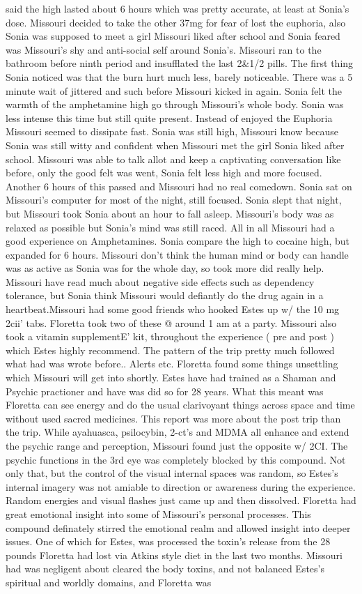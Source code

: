 \documentclass[12pt]{book}
\begin{document}
said the high lasted about 6 hours which was pretty accurate, at least at Sonia's dose. Missouri decided to take the other 37mg for fear of lost the euphoria, also Sonia was supposed to meet a girl Missouri liked after school and Sonia feared was Missouri's shy and anti-social self around Sonia's. Missouri ran to the bathroom before ninth period and insufflated the last 2\&1/2 pills. The first thing Sonia noticed was that the burn hurt much less, barely noticeable. There was a 5 minute wait of jittered and such before Missouri kicked in again. Sonia felt the warmth of the amphetamine high go through Missouri's whole body. Sonia was less intense this time but still quite present. Instead of enjoyed the Euphoria Missouri seemed to dissipate fast. Sonia was still high, Missouri know because Sonia was still witty and confident when Missouri met the girl Sonia liked after school. Missouri was able to talk allot and keep a captivating conversation like before, only the good felt was went, Sonia felt less high and more focused. Another 6 hours of this passed and Missouri had no real comedown. Sonia sat on Missouri's computer for most of the night, still focused. Sonia slept that night, but Missouri took Sonia about an hour to fall asleep. Missouri's body was as relaxed as possible but Sonia's mind was still raced. All in all Missouri had a good experience on Amphetamines. Sonia compare the high to cocaine high, but expanded for 6 hours. Missouri don't think the human mind or body can handle was as active as Sonia was for the whole day, so took more did really help. Missouri have read much about negative side effects such as dependency tolerance, but Sonia think Missouri would defiantly do the drug again in a heartbeat.Missouri had some good friends who hooked Estes up w/ the 10 mg 2cii' tabs. Floretta took two of these @ around 1 am at a party. Missouri also took a vitamin supplementE' kit, throughout the experience ( pre and post ) which Estes highly recommend. The pattern of the trip pretty much followed what had was wrote before.. Alerts etc. Floretta found some things unsettling which Missouri will get into shortly. Estes have had trained as a Shaman and Psychic practioner and have was did so for 28 years. What this meant was Floretta can see energy and do the usual clarivoyant things across space and time without used sacred medicines. This report was more about the post trip than the trip. While ayahuasca, psilocybin, 2-ct's and MDMA all enhance and extend the psychic range and perception, Missouri found just the opposite w/ 2CI. The psychic functions in the 3rd eye was completely blocked by this compound. Not only that, but the control of the visual internal spaces was random, so Estes's internal imagery was not amiable to direction or awareness during the experience. Random energies and visual flashes just came up and then dissolved. Floretta had great emotional insight into some of Missouri's personal processes. This compound definately stirred the emotional realm and allowed insight into deeper issues. One of which for Estes, was processed the toxin's release from the 28 pounds Floretta had lost via Atkins style diet in the last two months. Missouri had was negligent about cleared the body toxins, and not balanced Estes's spiritual and worldly domains, and Floretta was 
\end{document}
